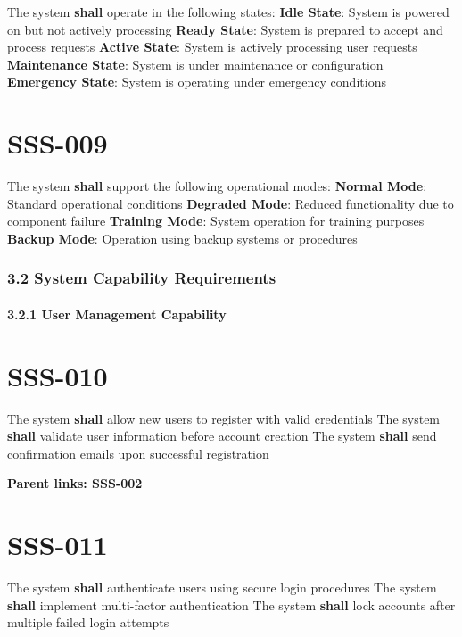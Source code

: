 The system \textbf{shall} operate in the following states:
\textbf{Idle State}: System is powered on but not actively processing
\textbf{Ready State}: System is prepared to accept and process requests
\textbf{Active State}: System is actively processing user requests
\textbf{Maintenance State}: System is under maintenance or configuration
\textbf{Emergency State}: System is operating under emergency conditions

\section{SSS-009}\label{SSS-009}

The system \textbf{shall} support the following operational modes:
\textbf{Normal Mode}: Standard operational conditions
\textbf{Degraded Mode}: Reduced functionality due to component failure
\textbf{Training Mode}: System operation for training purposes
\textbf{Backup Mode}: Operation using backup systems or procedures

\subsubsection{3.2 System Capability Requirements}

\paragraph{3.2.1 User Management Capability}

\section{SSS-010}\label{SSS-010}

The system \textbf{shall} allow new users to register with valid credentials
The system \textbf{shall} validate user information before account creation
The system \textbf{shall} send confirmation emails upon successful registration

\textbf{Parent links: SSS-002}

\section{SSS-011}\label{SSS-011}

The system \textbf{shall} authenticate users using secure login procedures
The system \textbf{shall} implement multi-factor authentication
The system \textbf{shall} lock accounts after multiple failed login attempts

